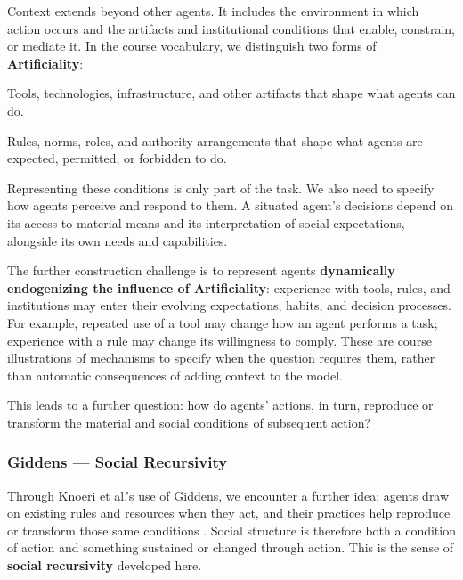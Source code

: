 \documentclass[11pt,a4paper]{article}
\begin{document}
Context extends beyond other agents. It includes the environment in which action occurs and the artifacts and institutional conditions that enable, constrain, or mediate it. In the course vocabulary, we distinguish two forms of \textbf{Artificiality}:

\begin{description}[style=nextline,leftmargin=0pt,labelindent=0pt,labelsep=0pt,labelwidth=0pt,itemindent=0pt,itemsep=4pt]
\item[Material Artificiality] Tools, technologies, infrastructure, and other artifacts that shape what agents can do.
\item[Social Artificiality] Rules, norms, roles, and authority arrangements that shape what agents are expected, permitted, or forbidden to do.
\end{description}

Representing these conditions is only part of the task. We also need to specify how agents perceive and respond to them. A situated agent's decisions depend on its access to material means and its interpretation of social expectations, alongside its own needs and capabilities.

The further construction challenge is to represent agents \textbf{dynamically endogenizing the influence of Artificiality}: experience with tools, rules, and institutions may enter their evolving expectations, habits, and decision processes. For example, repeated use of a tool may change how an agent performs a task; experience with a rule may change its willingness to comply. These are course illustrations of mechanisms to specify when the question requires them, rather than automatic consequences of adding context to the model.

This leads to a further question: how do agents' actions, in turn, reproduce or transform the material and social conditions of subsequent action?

\subsubsection{Giddens --- Social Recursivity}

Through Knoeri et al.'s use of Giddens, we encounter a further idea: agents draw on existing rules and resources when they act, and their practices help reproduce or transform those same conditions \cite{knoeri}. Social structure is therefore both a condition of action and something sustained or changed through action. This is the sense of \textbf{social recursivity} developed here.
\end{document}
